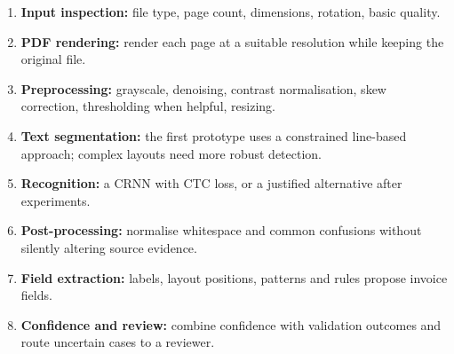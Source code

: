 \documentclass[11pt,a4paper]{report}
\begin{document}
\begin{enumerate}
\item \textbf{Input inspection:} file type, page count, dimensions, rotation, basic quality.
\item \textbf{PDF rendering:} render each page at a suitable resolution while keeping the original file.
\item \textbf{Preprocessing:} grayscale, denoising, contrast normalisation, skew correction, thresholding when helpful, resizing.
\item \textbf{Text segmentation:} the first prototype uses a constrained line-based approach; complex layouts need more robust detection.
\item \textbf{Recognition:} a CRNN with CTC loss, or a justified alternative after experiments.
\item \textbf{Post-processing:} normalise whitespace and common confusions without silently altering source evidence.
\item \textbf{Field extraction:} labels, layout positions, patterns and rules propose invoice fields.
\item \textbf{Confidence and review:} combine confidence with validation outcomes and route uncertain cases to a reviewer.
\end{enumerate}
\end{document}
